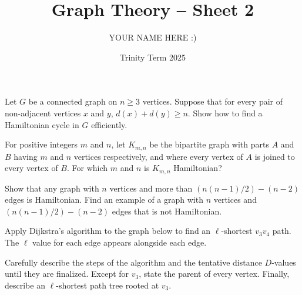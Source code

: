 \documentclass[answers]{exam}
\title{Graph Theory -- Sheet 2}
\author{YOUR NAME HERE :)}
\date{Trinity Term 2025}
\begin{document}
\maketitle
\begin{questions}

\question%
Let $G$ be a connected graph on $n \geqslant 3$ vertices. Suppose that for every pair of non-adjacent vertices $x$ and $y$, $d(x)+d(y) \geqslant n$. Show how to find a Hamiltonian cycle in $G$ efficiently.



\question%
For positive integers $m$ and $n$, let $K_{m, n}$ be the bipartite graph with parts $A$ and $B$ having $m$ and $n$ vertices respectively, and where every vertex of $A$ is joined to every vertex of $B$. For which $m$ and $n$ is $K_{m, n}$ Hamiltonian?



\question%
Show that any graph with $n$ vertices and more than $(n(n-1) / 2)-(n-2)$ edges is Hamiltonian. Find an example of a graph with $n$ vertices and $(n(n-1) / 2)-(n-2)$ edges that is not Hamiltonian.



\question%
Apply Dijkstra's algorithm to the graph below to find an $\ell$-shortest $v_{3} v_{4}$ path. The $\ell$ value for each edge appears alongside each edge.
\begin{center}\end{center}
Carefully describe the steps of the algorithm and the tentative distance $D$-values until they are finalized. Except for $v_{3}$, state the parent of every vertex. Finally, describe an $\ell$-shortest path tree rooted at $v_{3}$.




\end{questions}
\end{document}
